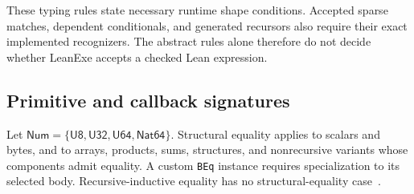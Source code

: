 \documentclass[11pt]{article}
\newcommand{\code}[1]{\texttt{#1}}
\newcommand{\ty}[1]{\mathsf{#1}}
\begin{document}
These typing rules state necessary runtime shape conditions.  Accepted sparse matches, dependent conditionals, and generated recursors also require their exact implemented recognizers.  The abstract rules alone therefore do not decide whether LeanExe accepts a checked Lean expression.

\subsection{Primitive and callback signatures}

Let $\ty{Num}=\{\ty{U8},\ty{U32},\ty{U64},\ty{Nat64}\}$.  Structural equality applies to scalars and bytes, and to arrays, products, sums, structures, and nonrecursive variants whose components admit equality.  A custom \code{BEq} instance requires specialization to its selected body.  Recursive-inductive equality has no structural-equality case~\cite{demand,extract}.
\end{document}
